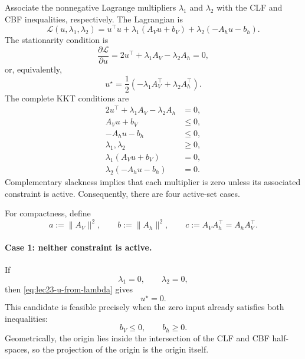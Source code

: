 \documentclass[../../master-handout.tex]{subfiles}
\begin{document}
Associate the nonnegative Lagrange multipliers $\lambda_1$ and $\lambda_2$ with the CLF and CBF inequalities, respectively. The Lagrangian is
\begin{equation}
    \mathcal{L}(u,\lambda_1,\lambda_2)
    =
    u^\top u
    +
    \lambda_1(A_Vu+b_V)
    +
    \lambda_2(-A_hu-b_h).
    \label{eq:lec23-unrelaxed-lagrangian}
\end{equation}
The stationarity condition is
\begin{equation}
    \frac{\partial\mathcal{L}}{\partial u}
    =
    2u^\top+\lambda_1A_V-\lambda_2A_h
    =
    0,
\end{equation}
or, equivalently,
\begin{equation}
    u^\star
    =
    \frac{1}{2}
    \left(
        -\lambda_1A_V^\top
        +
        \lambda_2A_h^\top
    \right).
    \label{eq:lec23-u-from-lambda}
\end{equation}
The complete KKT conditions are
\begin{align}
    2u^\top+\lambda_1A_V-\lambda_2A_h&=0,
    \label{eq:lec23-kkt-stationarity}
    \\
    A_Vu+b_V&\leq 0,
    \label{eq:lec23-kkt-primal-clf}
    \\
    -A_hu-b_h&\leq 0,
    \label{eq:lec23-kkt-primal-cbf}
    \\
    \lambda_1,\lambda_2&\geq 0,
    \label{eq:lec23-kkt-dual}
    \\
    \lambda_1(A_Vu+b_V)&=0,
    \label{eq:lec23-kkt-comp-clf}
    \\
    \lambda_2(-A_hu-b_h)&=0.
    \label{eq:lec23-kkt-comp-cbf}
\end{align}
Complementary slackness implies that each multiplier is zero unless its associated constraint is active. Consequently, there are four active-set cases.

For compactness, define
\begin{equation}
    a:=\|A_V\|^2,
    \qquad
    b:=\|A_h\|^2,
    \qquad
    c:=A_VA_h^\top=A_hA_V^\top.
    \label{eq:lec23-abc}
\end{equation}

\paragraph{Case 1: neither constraint is active.}

If
\begin{equation}
    \lambda_1=0,
    \qquad
    \lambda_2=0,
\end{equation}
then \eqref{eq:lec23-u-from-lambda} gives
\begin{equation}
    u^\star=0.
    \label{eq:lec23-case1}
\end{equation}
This candidate is feasible precisely when the zero input already satisfies both inequalities:
\begin{equation}
    b_V\leq 0,
    \qquad
    b_h\geq 0.
    \label{eq:lec23-case1-feasibility}
\end{equation}
Geometrically, the origin lies inside the intersection of the CLF and CBF half-spaces, so the projection of the origin is the origin itself.
\end{document}
